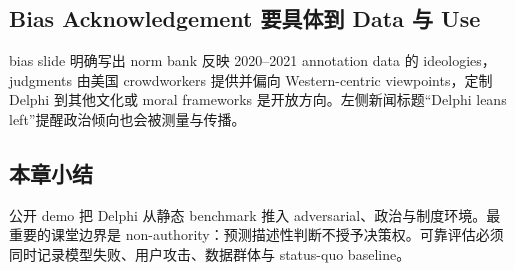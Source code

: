 
\subsection{Bias Acknowledgement 要具体到 Data 与 Use}

bias slide 明确写出 norm bank 反映 2020--2021 annotation data 的 ideologies，judgments 由美国 crowdworkers 提供并偏向 Western-centric viewpoints，定制 Delphi 到其他文化或 moral frameworks 是开放方向。左侧新闻标题“Delphi leans left”提醒政治倾向也会被测量与传播。



\subsection{本章小结}

公开 demo 把 Delphi 从静态 benchmark 推入 adversarial、政治与制度环境。最重要的课堂边界是 non-authority：预测描述性判断不授予决策权。可靠评估必须同时记录模型失败、用户攻击、数据群体与 status-quo baseline。


